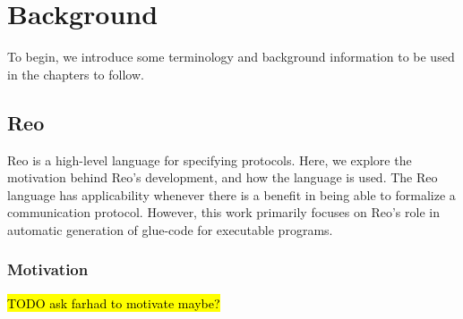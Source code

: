 
\chapter{Background}
\label{sec:background}
To begin, we introduce some terminology and background information to be used in the chapters to follow.

\section{Reo}
\label{sec:reo_background}
Reo is a high-level language for specifying protocols. Here, we explore the motivation behind Reo's development, and how the language is used.
The Reo language has applicability whenever there is a benefit in being able to formalize a communication protocol. However, this work primarily focuses on Reo's role in automatic generation of glue-code for executable programs.  

\subsection{Motivation}
\label{sec:reo_motivation}

\hl{TODO ask farhad to motivate maybe?}
%
%

